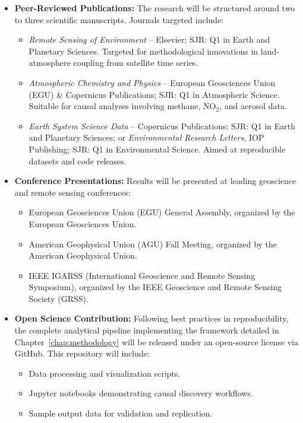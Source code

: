 \begin{itemize}
	\item \textbf{Peer-Reviewed Publications:} The research will be structured around two to three scientific manuscripts. Journals targeted include:
	      \begin{itemize}
		      \item \textit{Remote Sensing of Environment} – Elsevier; SJR: Q1 in Earth and Planetary Sciences. Targeted for methodological innovations in land-atmosphere coupling from satellite time series.
		      \item \textit{Atmospheric Chemistry and Physics} – European Geosciences Union (EGU) \& Copernicus Publications; SJR: Q1 in Atmospheric Science. Suitable for causal analyses involving methane, NO$_2$, and aerosol data.
		      \item \textit{Earth System Science Data} – Copernicus Publications; SJR: Q1 in Earth and Planetary Sciences; or \textit{Environmental Research Letters}, IOP Publishing; SJR: Q1 in Environmental Science. Aimed at reproducible datasets and code releases.
	      \end{itemize}

	\item \textbf{Conference Presentations:} Results will be presented at leading geoscience and remote sensing conferences:
	      \begin{itemize}
		      \item European Geosciences Union (EGU) General Assembly, organized by the European Geosciences Union.
		      \item American Geophysical Union (AGU) Fall Meeting, organized by the American Geophysical Union.
		      \item IEEE IGARSS (International Geoscience and Remote Sensing Symposium), organized by the IEEE Geoscience and Remote Sensing Society (GRSS).
	      \end{itemize}

	\item \textbf{Open Science Contribution:} Following best practices in reproducibility, the complete analytical pipeline implementing the framework detailed in Chapter~\ref{chap:methodology} will be released under an open-source license via GitHub. This repository will include:
	      \begin{itemize}
		      \item Data processing and visualization scripts.
		      \item Jupyter notebooks demonstrating causal discovery workflows.
		      \item Sample output data for validation and replication.
	      \end{itemize}


\end{itemize}
